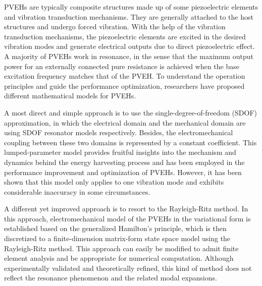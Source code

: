 \documentclass{svjour3}                     %
\begin{document}
PVEHs are typically composite structures made up of some piezoelectric elements and vibration transduction mechanisms. They are generally attached to the host structures and undergo forced vibration. With the help of the vibration transduction mechanisms, the piezoelectric elements are excited in the desired vibration modes and generate electrical outputs due to direct piezoelectric effect. A majority of PVEHs work in resonance, in the sense that the maximum output power for an externally connected pure resistance is achieved when the base excitation frequency matches that of the PVEH. \cite{roundy2003study} To understand the operation principles and guide the performance optimization, researchers have proposed different mathematical models for PVEHs. 

A most direct and simple approach is to use the single-degree-of-freedom (SDOF) approximation, in which the electrical domain and the mechanical domain are using SDOF resonator models respectively. Besides, the electromechanical coupling between these two domains is represented by a constant coefficient. \cite{roundy2003study,dutoit2005design} This lumped-parameter model provides fruitful insights into the mechanism and dynamics behind the energy harvesting process and has been employed in the performance improvement and optimization of PVEHs. \cite{stephen2006energy,cottone2009nonlinear} However, it has been shown that this model only applies to one vibration mode and exhibits considerable inaccuracy in some circumstances. \cite{erturk2008mechanical}

A different yet improved approach is to resort to the Rayleigh-Ritz method. In this approach, electromechanical model of the PVEHs in the variational form is established based on the generalized Hamilton's principle, \cite{crandall1968dynamics} which is then discretized to a finite-dimension matrix-form state space model using the Rayleigh-Ritz method. \cite{hagood1990modelling} This approach can easily be modified to admit finite element analysis and be appropriate for numerical computation. Although experimentally validated and theoretically refined, \cite{sodano2004estimation,lu2003modeling,chen2006analytical,ajitsaria2007modeling} this kind of method does not reflect the resonance phenomenon and the related modal expansions. 
\end{document}
